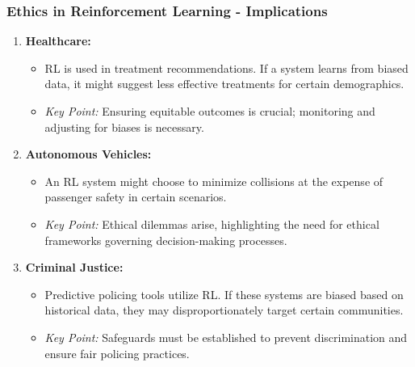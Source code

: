 \documentclass[aspectratio=169]{beamer}
\begin{document}
\begin{frame}[fragile]
    \frametitle{Ethics in Reinforcement Learning - Implications}
    \begin{enumerate}
        \item \textbf{Healthcare:}
            \begin{itemize}
                \item RL is used in treatment recommendations. If a system learns from biased data, it might suggest less effective treatments for certain demographics.
                \item \textit{Key Point:} Ensuring equitable outcomes is crucial; monitoring and adjusting for biases is necessary.
            \end{itemize}

        \item \textbf{Autonomous Vehicles:}
            \begin{itemize}
                \item An RL system might choose to minimize collisions at the expense of passenger safety in certain scenarios.
                \item \textit{Key Point:} Ethical dilemmas arise, highlighting the need for ethical frameworks governing decision-making processes.
            \end{itemize}

        \item \textbf{Criminal Justice:}
            \begin{itemize}
                \item Predictive policing tools utilize RL. If these systems are biased based on historical data, they may disproportionately target certain communities.
                \item \textit{Key Point:} Safeguards must be established to prevent discrimination and ensure fair policing practices.
            \end{itemize}
    \end{enumerate}
\end{frame}
\end{document}
